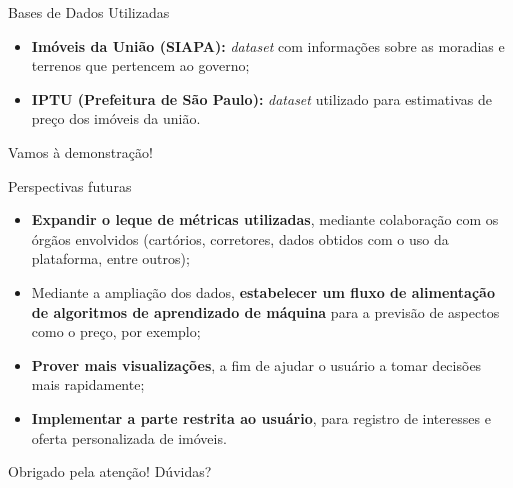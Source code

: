 \documentclass[10pt]{beamer}
\begin{document}
\begin{frame}{Bases de Dados Utilizadas}
    \begin{itemize}
        \item<+-> \textbf{Imóveis da União (SIAPA):} \textit{dataset} com informações sobre as moradias e terrenos que pertencem ao governo;
        \item<+-> \textbf{IPTU (Prefeitura de São Paulo):} \textit{dataset} utilizado para estimativas de preço dos imóveis da união.
    \end{itemize}
\end{frame}

\begin{frame}[standout]
  \begin{center}
      Vamos à demonstração!
  \end{center}
\end{frame}

\begin{frame}{Perspectivas futuras}
    \begin{itemize}
        \item<+-> \textbf{Expandir o leque de métricas utilizadas}, mediante colaboração com os órgãos envolvidos (cartórios, corretores, dados obtidos com o uso da plataforma, entre outros);
        \item<+-> Mediante a ampliação dos dados, \textbf{estabelecer um fluxo de alimentação de algoritmos de aprendizado de máquina} para a previsão de aspectos como o preço, por exemplo;
        \item<+-> \textbf{Prover mais visualizações}, a fim de ajudar o usuário a tomar decisões mais rapidamente;
        \item<+-> \textbf{Implementar a parte restrita ao usuário}, para registro de interesses e oferta personalizada de imóveis.
    \end{itemize}
\end{frame}

\begin{frame}[standout]
    Obrigado pela atenção! Dúvidas?
\end{frame}
\end{document}
